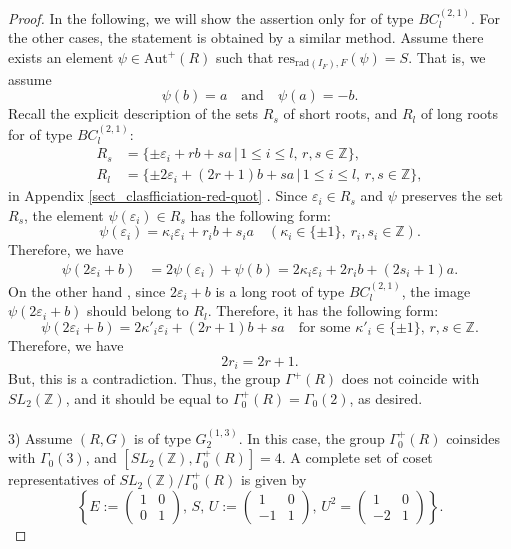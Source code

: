 \documentclass[11pt]{amsart}
\begin{document}
{{\begin{proof}
In the following, we will show the assertion only for of type $BC_l^{(2,1)}$. 
For the other cases, the statement is obtained by a similar method. 
Assume there exists an element $\psi\in \mathrm{Aut}^+(R)$ such that 
$\mathrm{res}_{\mathrm{rad}(I_F),F}(\psi)=S$. That is, we assume
\[\psi(b)=a\quad \mbox{and}\quad \psi(a)=-b.\]
Recall the explicit description of the sets $R_s$ of short roots, and $R_l$ of long roots 
for of type $BC_l^{(2,1)}$:
\[\begin{aligned}
R_s&=\{\pm\varepsilon_i+rb+sa\, |\,1\leq i\leq l,\,r,s\in\mathbb{Z}\},\\[3pt]
R_l&=\{\pm2\varepsilon_i+(2r+1)b+sa\, |\,1\leq i\leq l,\,r,s\in\mathbb{Z}\},
\end{aligned}\]
in Appendix \ref{sect_clasfficiation-red-quot} . 
Since $\varepsilon_i\in R_s$ and $\psi$ preserves the 
set $R_s$, the element $\psi(\varepsilon_i)\in R_s$ has the following form:
\[\psi(\varepsilon_i)=\kappa_i\varepsilon_i+r_ib+s_ia\quad 
(\kappa_i\in\{\pm 1\},\ r_i,s_i\in\mathbb{Z}).\]
Therefore, we have
\[\begin{aligned}
\psi(2\varepsilon_i+b)&=2\psi(\varepsilon_i)+\psi(b)
=2\kappa_i\varepsilon_i+2r_i b+(2s_i+1) a.
\end{aligned}\]
On the other hand , since $2\varepsilon_i+b$ is a long root of type $BC_l^{(2,1)}$, 
the image $\psi(2\varepsilon_i+b)$ should belong to $R_l$. Therefore, it has the  
following form:
\[\psi(2\varepsilon_i+b)=2\kappa'_i\varepsilon_i+(2r+1)b+sa\quad
\mbox{for some }\kappa'_i\in \{\pm 1\},\, r,s\in\mathbb{Z}.\]
Therefore, we have
\[2r_i=2r+1.\]
But, this is a contradiction. Thus, the group
$\Gamma^+(R)$ does not coincide with ${SL}_2(\mathbb{Z})$, and it should be 
equal to $\Gamma_0^+(R)=\Gamma_0(2)$, as desired. \\
\\
3) Assume $(R,G)$ is of type $G_2^{(1,3)}$.  In this case, the group 
$\Gamma_0^+(R)$ coinsides with $\Gamma_0(3)$, and 
$[{SL}_2(\mathbb{Z}),\Gamma_0^+(R)]=4$. A complete set of coset 
representatives of ${SL}_2(\mathbb{Z})/\Gamma_0^+(R)$ is given by
\[\left\{E:=\begin{pmatrix}1 & 0\\ 0 & 1\end{pmatrix},\, S,\, 
U:=\begin{pmatrix} 1 & 0 \\ -1 & 1\end{pmatrix},\, U^2=
\begin{pmatrix} 1 & 0 \\ -2 & 1\end{pmatrix}\right\}.\]

\end{proof}}}
\end{document}
